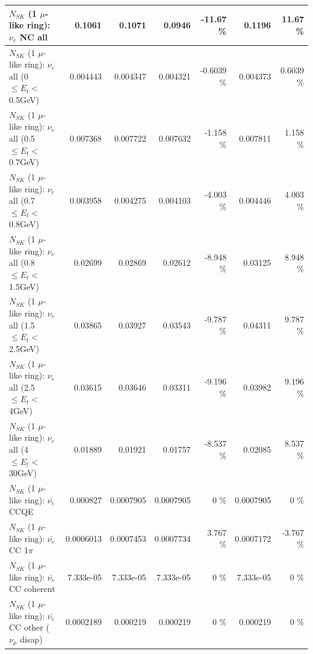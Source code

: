 \begin{table}
\begin{tabular}{| l | r | r | r  r | r  r |}
                                  $N_{SK}$ (1 $\mu$-like ring): $\nu_{e}$ NC all &          0.1061 &          0.1071 &          0.0946 &   -11.67 \%  &          0.1196 &    11.67 \%  \\ 
\hline
           $N_{SK}$ (1 $\mu$-like ring): $\nu_{e}$ all (0 $\leq E_{t} <$ 0.5GeV) &        0.004443 &        0.004347 &        0.004321 &  -0.6039 \%  &        0.004373 &   0.6039 \%  \\ 
         $N_{SK}$ (1 $\mu$-like ring): $\nu_{e}$ all (0.5 $\leq E_{t} <$ 0.7GeV) &        0.007368 &        0.007722 &        0.007632 &   -1.158 \%  &        0.007811 &    1.158 \%  \\ 
         $N_{SK}$ (1 $\mu$-like ring): $\nu_{e}$ all (0.7 $\leq E_{t} <$ 0.8GeV) &        0.003958 &        0.004275 &        0.004103 &   -4.003 \%  &        0.004446 &    4.003 \%  \\ 
         $N_{SK}$ (1 $\mu$-like ring): $\nu_{e}$ all (0.8 $\leq E_{t} <$ 1.5GeV) &         0.02699 &         0.02869 &         0.02612 &   -8.948 \%  &         0.03125 &    8.948 \%  \\ 
         $N_{SK}$ (1 $\mu$-like ring): $\nu_{e}$ all (1.5 $\leq E_{t} <$ 2.5GeV) &         0.03865 &         0.03927 &         0.03543 &   -9.787 \%  &         0.04311 &    9.787 \%  \\ 
           $N_{SK}$ (1 $\mu$-like ring): $\nu_{e}$ all (2.5 $\leq E_{t} <$ 4GeV) &         0.03615 &         0.03646 &         0.03311 &   -9.196 \%  &         0.03982 &    9.196 \%  \\ 
            $N_{SK}$ (1 $\mu$-like ring): $\nu_{e}$ all (4 $\leq E_{t} <$ 30GeV) &         0.01889 &         0.01921 &         0.01757 &   -8.537 \%  &         0.02085 &    8.537 \%  \\ 
\hline
\hline
\hline
                                $N_{SK}$ (1 $\mu$-like ring): $\bar{\nu_e}$ CCQE &        0.000827 &       0.0007905 &       0.0007905 &        0 \%  &       0.0007905 &        0 \%  \\ 
                           $N_{SK}$ (1 $\mu$-like ring): $\bar{\nu_e}$ CC 1$\pi$ &       0.0006013 &       0.0007453 &       0.0007734 &    3.767 \%  &       0.0007172 &   -3.767 \%  \\ 
                         $N_{SK}$ (1 $\mu$-like ring): $\bar{\nu_e}$ CC coherent &       7.333e-05 &       7.333e-05 &       7.333e-05 &        0 \%  &       7.333e-05 &        0 \%  \\ 
          $N_{SK}$ (1 $\mu$-like ring): $\bar{\nu_e}$ CC other ($\nu_\mu$ disap) &       0.0002189 &        0.000219 &        0.000219 &        0 \%  &        0.000219 &        0 \%  \\ 

\end{tabular}
\end{table}
